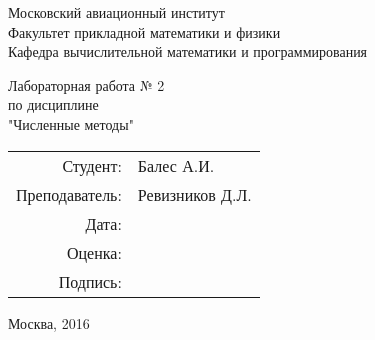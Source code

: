 \thispagestyle{empty}

\begin{center}
Московский авиационный институт\\
\vspace{0.5cm}
Факультет прикладной математики и физики\\
\vspace{0.5cm}
Кафедра вычислительной математики и программирования\\

\vspace{3cm}

Лабораторная работа № 2\\
по дисциплине\\
"Численные методы"\\
\end{center}

\vspace{3cm}

\begin{flushright}
\begin{tabular}{rl}
Студент: & Балес А.И.\\
Преподаватель: & Ревизников Д.Л. \\
Дата: & \\
Оценка: & \\
Подпись: & \\
\end{tabular}
\end{flushright}

\vspace{5cm}

\begin{center}
Москва, 2016
\end{center}

\pagebreak
